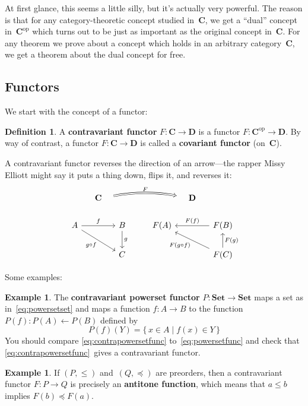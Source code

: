 \documentclass[letterpaper,12pt]{article}
\newcommand{\from}{\leftarrow}
\newcommand{\after}{\circ}
\newcommand{\cat}[1]{\mathbf{#1}}
\newcommand{\dual}[1]{#1^{\mathrm{op}}}
\newcommand{\Set}{\cat{Set}}
\newcommand{\textdefn}{\textbf}
\theoremstyle{definition}
\newtheorem{defn}[equation]{Definition}
\newtheorem{exmp}[equation]{Example}
\theoremstyle{plain}
\numberwithin{equation}{section}
\begin{document}
At first glance, this seems a little silly, but it's actually very powerful. The reason is that for any category-theoretic concept studied in~\(\cat{C}\), we get a ``dual'' concept in~\(\dual{\cat{C}}\) which turns out to be just as important as the original concept in~\(\cat{C}\). For any theorem we prove about a concept which holds in an arbitrary category~\(\cat{C}\), we get a theorem about the dual concept for free.

\subsection{Functors}
We start with the concept of a functor:
\begin{defn}
A \textdefn{contravariant functor} \(F:\cat{C}\to\cat{D}\) is a functor \(F:\dual{\cat{C}}\to\cat{D}\). By way of contrast, a functor \(F:\cat{C}\to\cat{D}\) is called a \textdefn{covariant functor} (on~\(\cat{C}\)).
\end{defn}
\noindent A contravariant functor reverses the direction of an arrow---the rapper Missy Elliott might say it puts a thing down, flips it, and reverses it:
\begin{equation}
\begin{tikzcd}[column sep=small]
& \cat{C} \ar[rrrr, Rightarrow, shorten=1em, bend left=10, "F"] &&&& \cat{D} & \\
A \ar[rrd, "g\after f"'] \ar[rr,"f"] && B \ar[d,"g"] && F(A) && F(B) \ar[ll,"F(f)"'] \\
  && C && && F(C) \ar[llu, "F(g\after f)"] \ar[u,"F(g)"']
\end{tikzcd}
\end{equation}

\noindent Some examples:
\begin{exmp}
The \textdefn{contravariant powerset functor} \(P:\Set\to\Set\) maps a set as in~\eqref{eq:powersetset} and maps a function \(f:A\to B\) to the function \(P(f):P(A)\from P(B)\) defined by
\begin{equation}
P(f)(Y)=\{\,x\in A\mid f(x)\in Y\,\}
\label{eq:contrapowersetfunc}
\end{equation}
You should compare \eqref{eq:contrapowersetfunc} to~\eqref{eq:powersetfunc} and check that \eqref{eq:contrapowersetfunc}~gives a contravariant functor.
\end{exmp}

\begin{exmp}
If \((P,\le)\) and~\((Q,\preccurlyeq)\) are preorders, then a contravariant functor \(F:P\to Q\) is precisely an \textdefn{antitone function}, which means that \(a\le b\) implies \(F(b)\preccurlyeq F(a)\).
\end{exmp}
\end{document}
